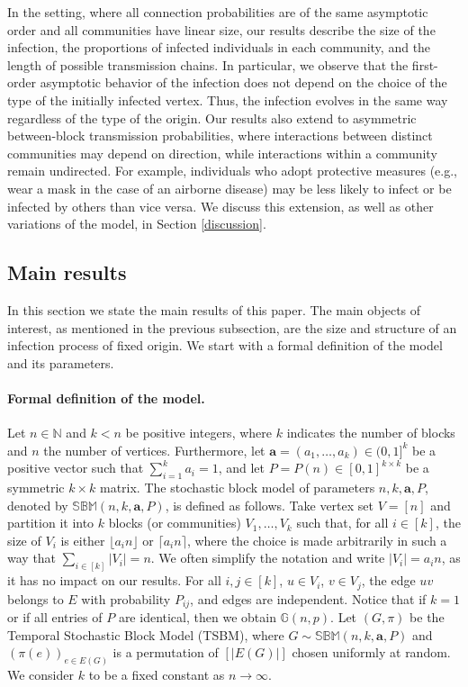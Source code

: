 \documentclass[11pt]{article}
\numberwithin{equation}{section}
\theoremstyle{definition}
\newcommand\bG{{\mathbb G}}
\begin{document}
In the setting, where all connection probabilities are of the same asymptotic order and all communities have linear size, our results describe the size of the infection, the proportions of infected individuals in each community, and the length of possible transmission chains. In particular, we observe that the first-order asymptotic behavior of the infection does not depend on the choice of the type of the initially infected vertex. Thus, the infection evolves in the same way regardless of the type of the origin. Our results also extend to asymmetric between-block transmission probabilities, where interactions between distinct communities may depend on direction, while interactions within a community remain undirected. For example, individuals who adopt protective measures (e.g., wear a mask in the case of an airborne disease) may be less likely to infect or be infected by others than vice versa. We discuss this extension, as well as other variations of the model, in Section \ref{discussion}.


\subsection{Main results}
In this section we state the main results of this paper. The main objects of interest, as mentioned in the previous subsection, are the size and structure of an infection process of fixed origin. We start with a formal definition of the model and its parameters.

\paragraph{Formal definition of the model.}Let $n \in \mathbb{N}$ and $k< n$ be positive integers, where $k$ indicates the number of blocks and $n$ the number of vertices. Furthermore, let $\boldsymbol{a} = (a_1,\ldots,a_k) \in (0,1]^k$ be a positive vector such that $\sum_{i=1}^k a_i = 1$, and let $P=P(n) \in [0,1]^{k\times k}$ be a symmetric $k\times k$ matrix. The stochastic block model of parameters $n,k,\boldsymbol{a},P$, denoted by $\mathbb{S}\mathbb{B}\mathbb{M}(n,k,\boldsymbol{a},P)$, is defined as follows. Take vertex set $V=[n]$ and partition it into $k$ blocks (or communities) $V_1,\ldots,V_k$ such that, for all $i \in [k]$, the size of $V_i$ is either $\lfloor a_i n\rfloor$ or $\lceil a_in \rceil$, where the choice is made arbitrarily in such a way that $\sum_{i\in[k]}|V_i| = n$. We often simplify the notation and write $|V_i| = a_i n$, as it has no impact on our results. For all $i,j \in [k]$, $u \in V_i$, $v \in V_j$, the edge $uv$ belongs to $E$ with probability $P_{ij}$, and edges are independent. Notice that if $k=1$ or if all entries of $P$ are identical, then we obtain $\bG(n,p)$. Let $(G,\pi)$ be the Temporal Stochastic Block Model (TSBM), where $G \sim \mathbb{S}\mathbb{B}\mathbb{M}(n,k,\boldsymbol{a},P)$ and $(\pi(e))_{e\in E(G)}$ is a permutation of $[|E(G)|]$ chosen uniformly at random. We consider $k$ to be a fixed constant as $n\to \infty$.\\
\end{document}
